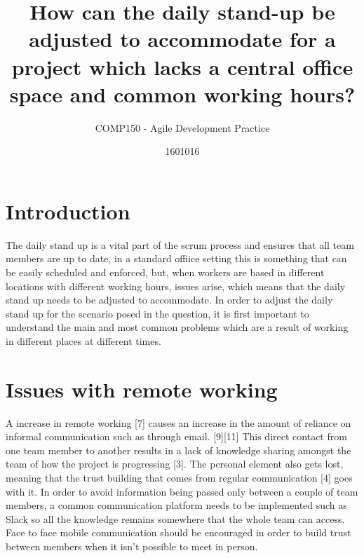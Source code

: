 \documentclass{scrartcl}
\title{How can the daily stand-up be adjusted to accommodate for a project which lacks a central office space and common working hours?}
\subtitle{COMP150 - Agile Development Practice}
\author{1601016}
\begin{document}
\maketitle


\section{Introduction}

The daily stand up is a vital part of the scrum process and ensures that all team members are up to date, in a standard offiice setting this is something that can be easily scheduled and enforced, but, when workers are based in different locations with different working hours, issues arise, which means that the daily stand up needs to be adjusted to accommodate. In order to adjust the daily stand up for the scenario posed in the question, it is first important to understand the main and most common problems which are a result of working in different places at different times.

\section{Issues with remote working}

A increase in remote working [7] causes an increase in the amount of reliance on informal communication such as through email. [9][11] This direct contact from one team member to another results in a lack of knowledge sharing amongst the team of how the project is progressing [3]. The personal element also gets lost, meaning that the trust building that comes from regular communication [4] goes with it.
In order to avoid information being passed only between a couple of team members, a common communication platform needs to be implemented such as Slack so all the knowledge remains somewhere that the whole team can access. Face to face mobile communication should be encouraged in order to build trust between members when it isn’t possible to meet in person.
\end{document}
